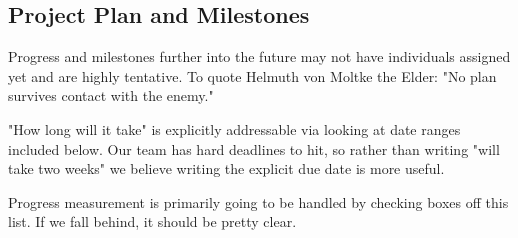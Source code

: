 \subsection{Project Plan and Milestones}

Progress and milestones further into the future may not have individuals assigned yet and are highly tentative. To quote Helmuth von Moltke the Elder: "No plan survives contact with the enemy."

"How long will it take" is explicitly addressable via looking at date ranges included below. Our team has hard deadlines to hit, so rather than writing "will take two weeks" we believe writing the explicit due date is more useful.

Progress measurement is primarily going to be handled by checking boxes off this list. If we fall behind, it should be pretty clear.


